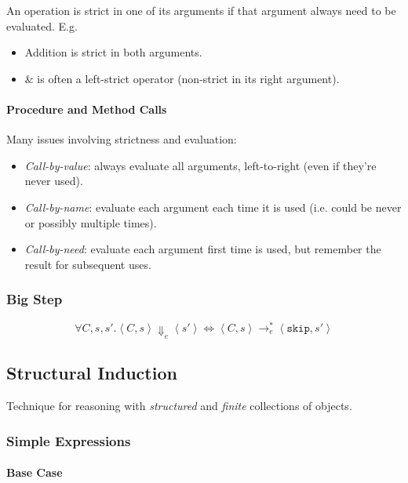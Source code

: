 \documentclass[twocolumn,english]{article}
\begin{document}
An operation is strict in one of its arguments if that argument always
need to be evaluated. E.g.
\begin{itemize}
\item Addition is strict in both arguments.
\item \texttt{$\&$} is often a left-strict operator (non-strict in its
right argument).
\end{itemize}

\paragraph{Procedure and Method Calls}

Many issues involving strictness and evaluation:
\begin{itemize}
\item \emph{Call-by-value}: always evaluate all arguments, left-to-right
(even if they're never used).
\item \emph{Call-by-name}: evaluate each argument each time it is used (i.e.
could be never or possibly multiple times).
\item \emph{Call-by-need}: evaluate each argument first time is used, but
remember the result for subsequent uses.
\end{itemize}

\subsubsection{Big Step}

\[
\forall C,s,s'.\left\langle C,s\right\rangle \Downarrow_{e}\left\langle s'\right\rangle \iff\left\langle C,s\right\rangle \rightarrow_{e}^{*}\left\langle \texttt{skip},s'\right\rangle 
\]

\subsection{Structural Induction}

Technique for reasoning with \emph{structured} and \emph{finite} collections
of objects.

\subsubsection{Simple Expressions}

\paragraph{Base Case}
\end{document}
